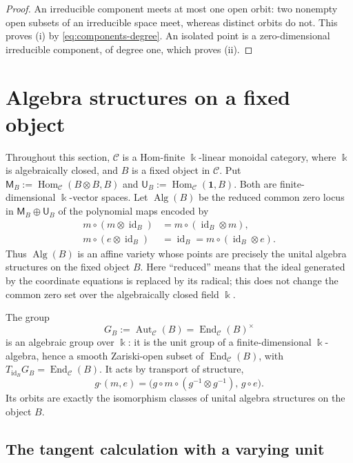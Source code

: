 \documentclass[11pt]{amsart}
\theoremstyle{definition}
\theoremstyle{remark}
\newcommand{\C}{\mathcal C}
\newcommand{\one}{\mathbf 1}
\newcommand{\kk}{\Bbbk}
\DeclareMathOperator{\Hom}{Hom}
\DeclareMathOperator{\End}{End}
\DeclareMathOperator{\Aut}{Aut}
\DeclareMathOperator{\Alg}{Alg}
\DeclareMathOperator{\id}{id}
\begin{document}
\begin{proof}
An irreducible component meets at most one open orbit: two nonempty open
subsets of an irreducible space meet, whereas distinct orbits do not.  This
proves \textup{(i)} by \eqref{eq:components-degree}.  An isolated point is a
zero-dimensional irreducible component, of degree one, which proves
\textup{(ii)}.
\end{proof}

\section{Algebra structures on a fixed object}\label{sec:structures}

Throughout this section, $\C$ is a Hom-finite $\kk$-linear monoidal
category, where $\kk$ is algebraically closed, and $B$ is a fixed object in
$\C$.  Put $\mathsf M_B:=\Hom_{\C}(B\otimes B,B)$ and
$\mathsf U_B:=\Hom_{\C}(\one,B)$.  Both are finite-dimensional
$\kk$-vector spaces.  Let $\Alg(B)$ be the reduced
common zero locus in $\mathsf M_B\oplus\mathsf U_B$ of the polynomial maps
encoded by
\begin{align}
  m\circ(m\otimes\id_B)&=m\circ(\id_B\otimes m),\label{eq:alg-assoc}\\
  m\circ(e\otimes\id_B)&=\id_B
  =m\circ(\id_B\otimes e).\label{eq:alg-unit}
\end{align}
Thus $\Alg(B)$ is an affine variety whose points are precisely the unital
algebra structures on the fixed object $B$.  Here ``reduced'' means that the
ideal generated by the coordinate equations is replaced by its radical; this
does not change the common zero set over the algebraically closed field
$\kk$.

The group
\[
  G_B:=\Aut_{\C}(B)=\End_{\C}(B)^\times
\]
is an algebraic group over $\kk$: it is the unit group of a
finite-dimensional $\kk$-algebra, hence a smooth Zariski-open subset of
$\End_{\C}(B)$, with $T_{\id_B}G_B=\End_{\C}(B)$.  It acts by transport of structure,
\begin{equation}\label{eq:transport-structure}
  g\boldsymbol\cdot(m,e)
  =\bigl(g\circ m\circ(g^{-1}\otimes g^{-1}),\,g\circ e\bigr).
\end{equation}
Its orbits are exactly the isomorphism classes of unital algebra structures
on the object $B$.

\subsection{The tangent calculation with a varying unit}
\end{document}

